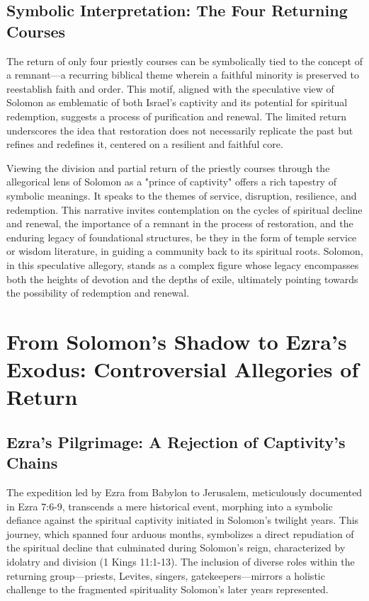 \section{Symbolic Interpretation: The Four Returning Courses}

The return of only four priestly courses can be symbolically tied to the concept of a remnant—a recurring biblical theme wherein a faithful minority is preserved to reestablish faith and order. This motif, aligned with the speculative view of Solomon as emblematic of both Israel's captivity and its potential for spiritual redemption, suggests a process of purification and renewal. The limited return underscores the idea that restoration does not necessarily replicate the past but refines and redefines it, centered on a resilient and faithful core.

Viewing the division and partial return of the priestly courses through the allegorical lens of Solomon as a "prince of captivity" offers a rich tapestry of symbolic meanings. It speaks to the themes of service, disruption, resilience, and redemption. This narrative invites contemplation on the cycles of spiritual decline and renewal, the importance of a remnant in the process of restoration, and the enduring legacy of foundational structures, be they in the form of temple service or wisdom literature, in guiding a community back to its spiritual roots. Solomon, in this speculative allegory, stands as a complex figure whose legacy encompasses both the heights of devotion and the depths of exile, ultimately pointing towards the possibility of redemption and renewal.

\chapter{From Solomon's Shadow to Ezra's Exodus: Controversial Allegories of Return}

\section{Ezra's Pilgrimage: A Rejection of Captivity's Chains}

The expedition led by Ezra from Babylon to Jerusalem, meticulously documented in Ezra 7:6-9, transcends a mere historical event, morphing into a symbolic defiance against the spiritual captivity initiated in Solomon's twilight years. This journey, which spanned four arduous months, symbolizes a direct repudiation of the spiritual decline that culminated during Solomon's reign, characterized by idolatry and division (1 Kings 11:1-13). The inclusion of diverse roles within the returning group—priests, Levites, singers, gatekeepers—mirrors a holistic challenge to the fragmented spirituality Solomon's later years represented.

